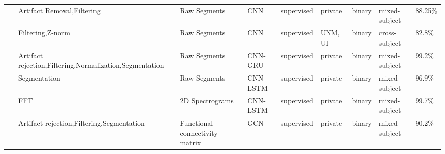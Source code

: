 \begin{table*}[ht]
\begin{tabular}{p{0.4cm}p{2.8cm}p{2cm}p{1.5cm}p{1.9cm}p{1.9cm}p{0.8cm}p{1.8cm}p{2cm}}
~\cite{oh2020deep} & Artifact Removal,\newline Filtering & Raw Segments & CNN & supervised & private & binary & mixed-subject & 88.25\% \\
~\cite{PD14} & Filtering,Z-norm & Raw Segments & CNN & supervised & UNM, \newline UI & binary & cross-subject & 82.8\% \\
~\cite{PD15} & Artifact rejection,\newline Filtering,Normalization,\newline Segmentation & Raw Segments & CNN-GRU & supervised & private & binary & mixed-subject & 99.2\% \\
~\cite{PD16} & Segmentation & Raw Segments & CNN-LSTM & supervised & private & binary & mixed-subject & 96.9\% \\
~\cite{PD17} & FFT & 2D Spectrograms & CNN-LSTM & supervised & private & binary & mixed-subject & 99.7\% \\
~\cite{PD18} & Artifact rejection,\newline Filtering,Segmentation & Functional connectivity matrix & GCN & supervised & private & binary & mixed-subject & 90.2\% \\
\hline
\end{tabular}
\end{table*}





